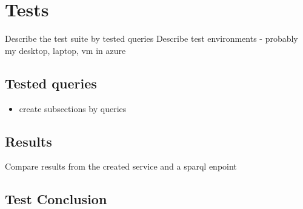 \chapter{Tests}
\label{chap:Tests}
Describe the test suite by tested queries
Describe test environments - probably my desktop, laptop, vm in azure
\section{Tested queries}
\begin{itemize}
\item create subsections by queries
\end{itemize}

\section{Results}
Compare results from the created service and a sparql enpoint

\section{Test Conclusion}

